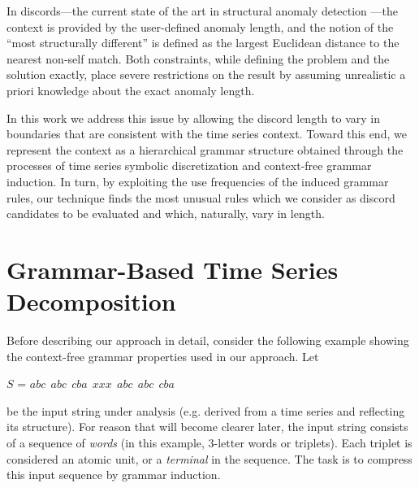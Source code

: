 \documentclass{sig-alternate}
\begin{document}
In discords---the current state of the art in structural anomaly detection \cite{chan_anomaly}---the context is provided by the user-defined anomaly length, and the notion of the ``most structurally different'' is defined as the largest Euclidean distance to the nearest non-self match. Both constraints, while defining the problem and the solution exactly, place severe restrictions on the result by assuming unrealistic a priori knowledge about the exact anomaly length. 

In this work we address this issue by allowing the discord length to vary in boundaries that are consistent with the time series context. Toward this end, we represent the context as a hierarchical grammar structure obtained through the processes of time series symbolic discretization and context-free grammar induction. In turn, by exploiting the use frequencies of the induced grammar rules, our technique finds the most unusual rules which we consider as discord candidates to be evaluated and which, naturally, vary in length.

\section{Grammar-Based Time Series Decomposition}\label{discretization}
Before describing our approach in detail, consider the following example showing the context-free grammar properties used in our approach. Let 
\begin{center}
\vspace{-1mm}
$S$ = $abc\ \ abc\ \ cba\ \ xxx\ \ abc\ \ abc\ \ cba$

\vspace{-1mm}
\end{center}
be the input string under analysis (e.g. derived from a time series and reflecting its structure). For reason that will become clearer later, the input string consists of a sequence of \textit{words} (in this example, 3-letter words or triplets). Each triplet is considered an atomic unit, or a \textit{terminal} in the sequence. The task is to compress this input sequence by grammar induction.
\end{document}
